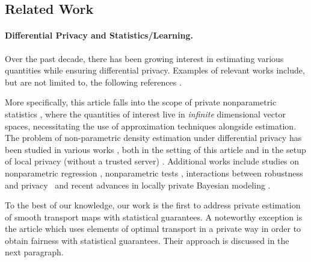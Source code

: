 \documentclass{article}
\theoremstyle{plain}
\theoremstyle{definition}
\theoremstyle{remark}
\begin{document}
\subsection{Related Work}

\paragraph{Differential Privacy and Statistics/Learning.}

Over the past decade, there has been growing interest in estimating various quantities while ensuring differential privacy. Examples of relevant works include, but are not limited to, the following references \cite{wasserman2010statistical,barber2014privacy,diakonikolas2015differentially,karwa2017finite,bun2019privatehypothesis,bun2021privatehypothesis,kamath2019highdimensional,biswas2020coinpress,kamath2020heavytailed,acharya2021differentially,lalanne:thesis,adenali2021unbounded,cai2021cost,brown2021covariance,cai2021cost,kamath2022improved,lalanne2023private,lalanne2022private,lalanne2024privatedensity,singhal2023polynomial,kamath2023biasvarianceprivacy,kamath2023new}. 

More specifically, this article falls into the scope of private nonparametric statistics \cite{tsybakov2003introduction}, where the quantities of interest live in \emph{infinite} dimensional vector spaces, necessitating the use of approximation techniques alongside estimation. 
The problem of non-parametric density estimation under differential privacy has been studied in various works \cite{wasserman2010statistical,barber2014privacy,lalanne2023about,lalanne2024privatedensity}, both in the setting of this article and in the setup of local privacy (without a trusted server) \cite{10.1145/773153.773174,4690986,duchi2013local,duchi2018minimax,butucea2020local,kroll2021density,schluttenhofer2022adaptive,gyorfi2023multivariate}. Additional works include studies on nonparametric regression \cite{berrett2021strongly,gyorfi2022rate}, nonparametric tests \cite{lam2022minimax}, interactions between robustness and privacy~\cite{chhor2023robust} and recent advances in locally private Bayesian modeling \cite{beraha2023mcmc}.

To the best of our knowledge, our work is the first to address private estimation of smooth transport maps with statistical guarantees. A noteworthy exception is the article \cite{xian2024DPfairRegression} which uses elements of optimal transport in a private way in order to obtain fairness with statistical guarantees. Their approach is discussed in the next paragraph.
\end{document}
